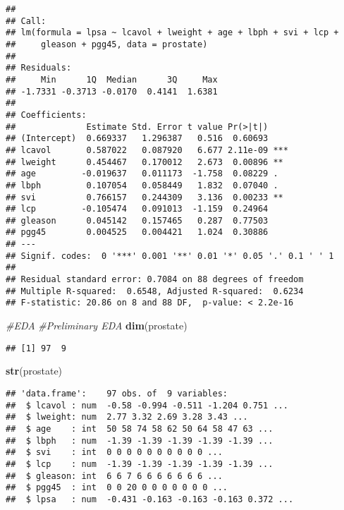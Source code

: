 \documentclass[
]{article}
\newenvironment{Shaded}{\begin{snugshade}}{\end{snugshade}}
\newcommand{\CommentTok}[1]{\textcolor[rgb]{0.56,0.35,0.01}{\textit{#1}}}
\newcommand{\FunctionTok}[1]{\textcolor[rgb]{0.13,0.29,0.53}{\textbf{#1}}}
\newcommand{\NormalTok}[1]{#1}
\begin{document}
\begin{verbatim}
## 
## Call:
## lm(formula = lpsa ~ lcavol + lweight + age + lbph + svi + lcp + 
##     gleason + pgg45, data = prostate)
## 
## Residuals:
##     Min      1Q  Median      3Q     Max 
## -1.7331 -0.3713 -0.0170  0.4141  1.6381 
## 
## Coefficients:
##              Estimate Std. Error t value Pr(>|t|)    
## (Intercept)  0.669337   1.296387   0.516  0.60693    
## lcavol       0.587022   0.087920   6.677 2.11e-09 ***
## lweight      0.454467   0.170012   2.673  0.00896 ** 
## age         -0.019637   0.011173  -1.758  0.08229 .  
## lbph         0.107054   0.058449   1.832  0.07040 .  
## svi          0.766157   0.244309   3.136  0.00233 ** 
## lcp         -0.105474   0.091013  -1.159  0.24964    
## gleason      0.045142   0.157465   0.287  0.77503    
## pgg45        0.004525   0.004421   1.024  0.30886    
## ---
## Signif. codes:  0 '***' 0.001 '**' 0.01 '*' 0.05 '.' 0.1 ' ' 1
## 
## Residual standard error: 0.7084 on 88 degrees of freedom
## Multiple R-squared:  0.6548, Adjusted R-squared:  0.6234 
## F-statistic: 20.86 on 8 and 88 DF,  p-value: < 2.2e-16
\end{verbatim}

\begin{Shaded}
\begin{Highlighting}[]
\CommentTok{\#EDA}
  \CommentTok{\#Preliminary EDA}
  \FunctionTok{dim}\NormalTok{(prostate)}
\end{Highlighting}
\end{Shaded}

\begin{verbatim}
## [1] 97  9
\end{verbatim}

\begin{Shaded}
\begin{Highlighting}[]
  \FunctionTok{str}\NormalTok{(prostate)}
\end{Highlighting}
\end{Shaded}

\begin{verbatim}
## 'data.frame':    97 obs. of  9 variables:
##  $ lcavol : num  -0.58 -0.994 -0.511 -1.204 0.751 ...
##  $ lweight: num  2.77 3.32 2.69 3.28 3.43 ...
##  $ age    : int  50 58 74 58 62 50 64 58 47 63 ...
##  $ lbph   : num  -1.39 -1.39 -1.39 -1.39 -1.39 ...
##  $ svi    : int  0 0 0 0 0 0 0 0 0 0 ...
##  $ lcp    : num  -1.39 -1.39 -1.39 -1.39 -1.39 ...
##  $ gleason: int  6 6 7 6 6 6 6 6 6 6 ...
##  $ pgg45  : int  0 0 20 0 0 0 0 0 0 0 ...
##  $ lpsa   : num  -0.431 -0.163 -0.163 -0.163 0.372 ...
\end{verbatim}
\end{document}
